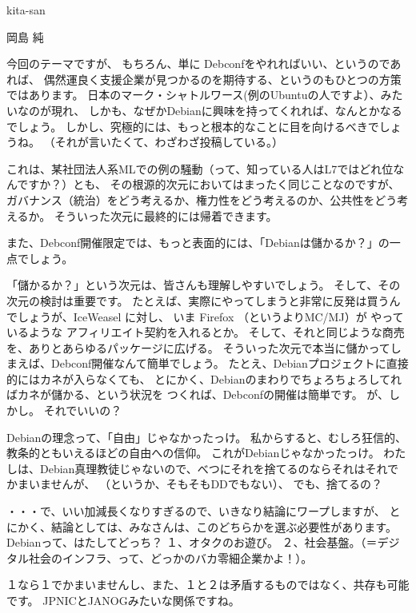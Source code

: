 \documentclass[cjk,dvipdfmx,12pt]{beamer}
\begin{document}
\begin{frame}{kita-san}
\end{frame}\begin{frame}{岡島 純}

今回のテーマですが、
もちろん、単に Debconfをやれればいい、というのであれば、
偶然運良く支援企業が見つかるのを期待する、というのもひとつの方策ではあります。
日本のマーク・シャトルワース(例のUbuntuの人ですよ）、みたいなのが現れ、
しかも、なぜかDebianに興味を持ってくれれば、なんとかなるでしょう。
しかし、究極的には、もっと根本的なことに目を向けるべきでしょうね。
（それが言いたくて、わざわざ投稿している。）

これは、某社団法人系MLでの例の騒動（って、知っている人はL7ではどれ位なんですか？）とも、
その根源的次元においてはまったく同じことなのですが、
ガバナンス（統治）をどう考えるか、権力性をどう考えるのか、公共性をどう考えるか。
そういった次元に最終的には帰着できます。

また、Debconf開催限定では、もっと表面的には、「Debianは儲かるか？」の一点でしょう。

「儲かるか？」という次元は、皆さんも理解しやすいでしょう。
そして、その次元の検討は重要です。
たとえば、実際にやってしまうと非常に反発は買うんでしょうが、IceWeasel に対し、
いま Firefox （というよりMC/MJ）が
やっているような アフィリエイト契約を入れるとか。
そして、それと同じような商売を、ありとあらゆるパッケージに広げる。
そういった次元で本当に儲かってしまえば、Debconf開催なんて簡単でしょう。
たとえ、Debianプロジェクトに直接的にはカネが入らなくても、
とにかく、Debianのまわりでちょろちょろしてればカネが儲かる、という状況を
つくれば、Debconfの開催は簡単です。
が、しかし。
それでいいの？

Debianの理念って、「自由」じゃなかったっけ。
私からすると、むしろ狂信的、教条的ともいえるほどの自由への信仰。
これがDebianじゃなかったっけ。
わたしは、Debian真理教徒じゃないので、べつにそれを捨てるのならそれはそれでかまいませんが、
（というか、そもそもDDでもない）、
でも、捨てるの？

・・・で、いい加減長くなりすぎるので、いきなり結論にワープしますが、
とにかく、結論としては、みなさんは、このどちらかを選ぶ必要性があります。
Debianって、はたしてどっち？
１、オタクのお遊び。
２、社会基盤。（＝デジタル社会のインフラ、って、どっかのバカ零細企業かよ！）。

１なら１でかまいませんし、また、１と２は矛盾するものではなく、共存も可能です。
JPNICとJANOGみたいな関係ですね。


\end{frame}
\end{document}
